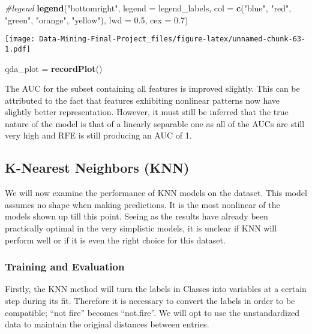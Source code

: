\documentclass[
]{article}
\newenvironment{Shaded}{\begin{snugshade}}{\end{snugshade}}
\newcommand{\AttributeTok}[1]{\textcolor[rgb]{0.13,0.29,0.53}{#1}}
\newcommand{\CommentTok}[1]{\textcolor[rgb]{0.56,0.35,0.01}{\textit{#1}}}
\newcommand{\FloatTok}[1]{\textcolor[rgb]{0.00,0.00,0.81}{#1}}
\newcommand{\FunctionTok}[1]{\textcolor[rgb]{0.13,0.29,0.53}{\textbf{#1}}}
\newcommand{\NormalTok}[1]{#1}
\newcommand{\OtherTok}[1]{\textcolor[rgb]{0.56,0.35,0.01}{#1}}
\newcommand{\StringTok}[1]{\textcolor[rgb]{0.31,0.60,0.02}{#1}}
\begin{document}
\begin{Shaded}
\begin{Highlighting}[]
\CommentTok{\#legend}
\FunctionTok{legend}\NormalTok{(}\StringTok{"bottomright"}\NormalTok{, }\AttributeTok{legend =}\NormalTok{ legend\_labels, }\AttributeTok{col =} \FunctionTok{c}\NormalTok{(}\StringTok{"blue"}\NormalTok{, }\StringTok{"red"}\NormalTok{, }\StringTok{"green"}\NormalTok{, }\StringTok{"orange"}\NormalTok{, }\StringTok{"yellow"}\NormalTok{), }\AttributeTok{lwd =} \FloatTok{0.5}\NormalTok{, }\AttributeTok{cex =} \FloatTok{0.7}\NormalTok{)}
\end{Highlighting}
\end{Shaded}

\texttt{[image: Data-Mining-Final-Project\_files/figure-latex/unnamed-chunk-63-1.pdf]}

\begin{Shaded}
\begin{Highlighting}[]
\NormalTok{qda\_plot }\OtherTok{=} \FunctionTok{recordPlot}\NormalTok{()}
\end{Highlighting}
\end{Shaded}

The AUC for the subset containing all features is improved slightly.
This can be attributed to the fact that features exhibiting nonlinear
patterns now have slightly better representation. However, it must still
be inferred that the true nature of the model is that of a linearly
separable one as all of the AUCs are still very high and RFE is still
producing an AUC of 1.

\subsection{K-Nearest Neighbors (KNN)}\label{k-nearest-neighbors-knn}

We will now examine the performance of KNN models on the dataset. This
model assumes no shape when making predictions. It is the most nonlinear
of the models shown up till this point. Seeing as the results have
already been practically optimal in the very simplistic models, it is
unclear if KNN will perform well or if it is even the right choice for
this dataset.

\subsubsection{Training and Evaluation}\label{training-and-evaluation}

Firstly, the KNN method will turn the labels in Classes into variables
at a certain step during its fit. Therefore it is necessary to convert
the labels in order to be compatible; ``not fire'' becomes ``not.fire''.
We will opt to use the unstandardized data to maintain the original
distances between entries.
\end{document}

